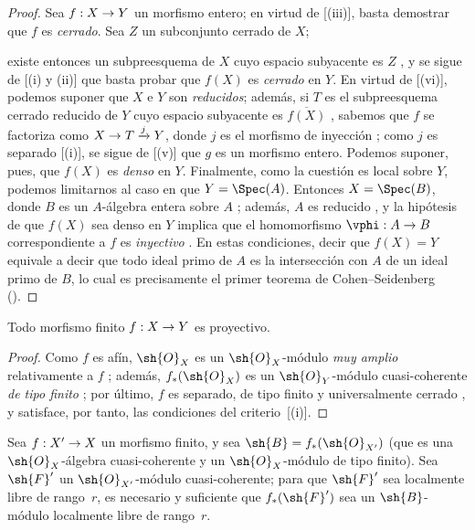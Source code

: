 \documentclass[oneside,10pt]{amsart}
\makeatletter
\newcommand{\ega@arrow}[2]{\mathchoice{#1}{#2}{#2}{#2}}
\renewcommand{\to}{\ega@arrow{\longrightarrow}{\rightarrow}}
\newcommand{\oldpage}[2][]{\marginnote{\normalfont\footnotesize\textbf{#1}~|~#2}\ignorespaces}
\let\EGAOriginalLabel\label
\renewcommand{\label}[1]{\phantomsection\EGAOriginalLabel{#1}}
\makeatother
\begin{document}
\begin{proof}
Sea $f:X\to Y$ un morfismo entero;
en virtud de [(iii)], basta demostrar que $f$ es \emph{cerrado}.
Sea $Z$ un subconjunto cerrado de $X$;

\oldpage[II]{113}
existe entonces un subpreesquema de $X$ cuyo espacio subyacente es $Z$ , y se sigue de [(i) y (ii)] que basta probar que $f(X)$ es \emph{cerrado} en $Y$.
En virtud de [(vi)], podemos suponer que $X$ e $Y$ son \emph{reducidos};
además, si $T$ es el subpreesquema cerrado reducido de $Y$ cuyo espacio subyacente es $\overline{f(X)}$ , sabemos que $f$ se factoriza como $X\to T\xrightarrow{j}Y$, donde $j$ es el morfismo de inyección ; como $j$ es separado [(i)], se sigue de [(v)] que $g$ es un morfismo entero.
Podemos suponer, pues, que $f(X)$ es \emph{denso} en $Y$.
Finalmente, como la cuestión es local sobre $Y$, podemos limitarnos al caso en que $Y=\Spec(A)$.
Entonces $X=\Spec(B)$, donde $B$ es un $A$-álgebra entera sobre $A$ ;
además, $A$ es reducido , y la hipótesis de que $f(X)$ sea denso en $Y$ implica que el homomorfismo $\vphi:A\to B$ correspondiente a $f$ es \emph{inyectivo} .
En estas condiciones, decir que $f(X)=Y$ equivale a decir que todo ideal primo de $A$ es la intersección con $A$ de un ideal primo de $B$, lo cual es precisamente el primer teorema de Cohen--Seidenberg (\cite[t.~I, p.~257, th.~3]{I-13}).
\end{proof}

\begin{corollary}[6.1.11]
\label{II.6.1.11}
Todo morfismo finito $f:X\to Y$ es proyectivo.
\end{corollary}

\begin{proof}
Como $f$ es afín, $\sh{O}_X$ es un $\sh{O}_X$-módulo \emph{muy amplio} relativamente a $f$ ;
además, $f_*(\sh{O}_X)$ es un $\sh{O}_Y$-módulo cuasi-coherente \emph{de tipo finito} ;
por último, $f$ es separado, de tipo finito y universalmente cerrado , y satisface, por tanto, las condiciones del criterio~[(i)].
\end{proof}

\begin{proposition}[6.1.12]
\label{II.6.1.12}
Sea $f:X'\to X$ un morfismo finito, y sea $\sh{B}=f_*(\sh{O}_{X'})$ (que es una $\sh{O}_X$-álgebra cuasi-coherente y un $\sh{O}_X$-módulo de tipo finito).
Sea $\sh{F}'$ un $\sh{O}_{X'}$-módulo cuasi-coherente;
para que $\sh{F}'$ sea localmente libre de rango~$r$, es necesario y suficiente que $f_*(\sh{F}')$ sea un $\sh{B}$-módulo localmente libre de rango~$r$.
\end{proposition}
\end{document}
